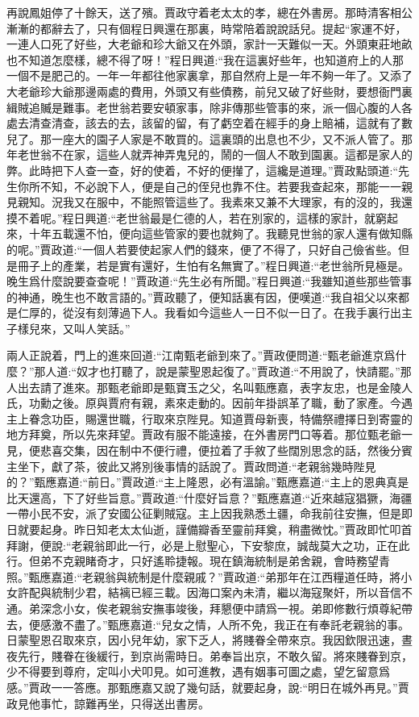 \begin{parag}
    再說鳳姐停了十餘天，送了殯。賈政守着老太太的孝，總在外書房。那時清客相公漸漸的都辭去了，只有個程日興還在那裏，時常陪着說說話兒。提起“家運不好，一連人口死了好些，大老爺和珍大爺又在外頭，家計一天難似一天。外頭東莊地畝也不知道怎麼樣，總不得了呀！”程日興道:“我在這裏好些年，也知道府上的人那一個不是肥己的。一年一年都往他家裏拿，那自然府上是一年不夠一年了。又添了大老爺珍大爺那邊兩處的費用，外頭又有些債務，前兒又破了好些財，要想衙門裏緝賊追贓是難事。老世翁若要安頓家事，除非傳那些管事的來，派一個心腹的人各處去清查清查，該去的去，該留的留，有了虧空着在經手的身上賠補，這就有了數兒了。那一座大的園子人家是不敢買的。這裏頭的出息也不少，又不派人管了。那年老世翁不在家，這些人就弄神弄鬼兒的，鬧的一個人不敢到園裏。這都是家人的弊。此時把下人查一查，好的使着，不好的便攆了，這纔是道理。”賈政點頭道:“先生你所不知，不必說下人，便是自己的侄兒也靠不住。若要我查起來，那能一一親見親知。況我又在服中，不能照管這些了。我素來又兼不大理家，有的沒的，我還摸不着呢。”程日興道:“老世翁最是仁德的人，若在別家的，這樣的家計，就窮起來，十年五載還不怕，便向這些管家的要也就夠了。我聽見世翁的家人還有做知縣的呢。”賈政道:“一個人若要使起家人們的錢來，便了不得了，只好自己儉省些。但是冊子上的產業，若是實有還好，生怕有名無實了。”程日興道:“老世翁所見極是。晚生爲什麼說要查查呢！”賈政道:“先生必有所聞。”程日興道:“我雖知道些那些管事的神通，晚生也不敢言語的。”賈政聽了，便知話裏有因，便嘆道:“我自祖父以來都是仁厚的，從沒有刻薄過下人。我看如今這些人一日不似一日了。在我手裏行出主子樣兒來，又叫人笑話。”
\end{parag}


\begin{parag}
    兩人正說着，門上的進來回道:“江南甄老爺到來了。”賈政便問道:“甄老爺進京爲什麼？”那人道:“奴才也打聽了，說是蒙聖恩起復了。”賈政道:“不用說了，快請罷。”那人出去請了進來。那甄老爺即是甄寶玉之父，名叫甄應嘉，表字友忠，也是金陵人氏，功勳之後。原與賈府有親，素來走動的。因前年掛誤革了職，動了家產。今遇主上眷念功臣，賜還世職，行取來京陛見。知道賈母新喪，特備祭禮擇日到寄靈的地方拜奠，所以先來拜望。賈政有服不能遠接，在外書房門口等着。那位甄老爺一見，便悲喜交集，因在制中不便行禮，便拉着了手敘了些闊別思念的話，然後分賓主坐下，獻了茶，彼此又將別後事情的話說了。賈政問道:“老親翁幾時陛見的？”甄應嘉道:“前日。”賈政道:“主上隆恩，必有溫諭。”甄應嘉道:“主上的恩典真是比天還高，下了好些旨意。”賈政道:“什麼好旨意？”甄應嘉道:“近來越寇猖獗，海疆一帶小民不安，派了安國公征剿賊寇。主上因我熟悉土疆，命我前往安撫，但是即日就要起身。昨日知老太太仙逝，謹備瓣香至靈前拜奠，稍盡微忱。”賈政即忙叩首拜謝，便說:“老親翁即此一行，必是上慰聖心，下安黎庶，誠哉莫大之功，正在此行。但弟不克親睹奇才，只好遙聆捷報。現在鎮海統制是弟舍親，會時務望青照。”甄應嘉道:“老親翁與統制是什麼親戚？”賈政道:“弟那年在江西糧道任時，將小女許配與統制少君，結褵已經三載。因海口案內未清，繼以海寇聚奸，所以音信不通。弟深念小女，俟老親翁安撫事竣後，拜懇便中請爲一視。弟即修數行煩尊紀帶去，便感激不盡了。”甄應嘉道:“兒女之情，人所不免，我正在有奉託老親翁的事。日蒙聖恩召取來京，因小兒年幼，家下乏人，將賤眷全帶來京。我因欽限迅速，晝夜先行，賤眷在後緩行，到京尚需時日。弟奉旨出京，不敢久留。將來賤眷到京，少不得要到尊府，定叫小犬叩見。如可進教，遇有姻事可圖之處，望乞留意爲感。”賈政一一答應。那甄應嘉又說了幾句話，就要起身，說:“明日在城外再見。”賈政見他事忙，諒難再坐，只得送出書房。
\end{parag}


